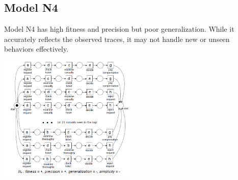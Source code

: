     \subsection{Model N4}
    Model N4 has high fitness and precision but poor generalization. While it accurately reflects the observed traces, it may not handle new or unseen behaviors effectively.
    \begin{center}
        \includegraphics[width=0.5\textwidth]{capitolo 5/5 n4.png} %
    \end{center}
